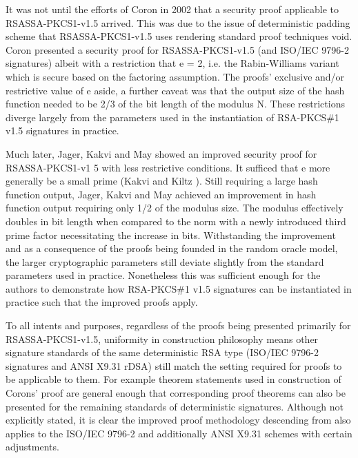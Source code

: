\documentclass[]{final_report}
\theoremstyle{definition}
\begin{document}
It was not until the efforts of Coron \cite{coron2002security} in 2002 that a security proof applicable to RSASSA-PKCS1-v1.5 arrived. This was due to the issue of deterministic padding scheme that RSASSA-PKCS1-v1.5 uses rendering standard proof techniques void. Coron presented a security proof for RSASSA-PKCS1-v1.5 (and ISO/IEC 9796-2 signatures) albeit with a restriction that e = 2, i.e. the Rabin-Williams variant \cite{coron2002security} which is secure based on the factoring assumption. 
The proofs' exclusive and/or restrictive value of e aside, a further caveat was that the output size of the hash function needed to be 2/3 of the bit length of the modulus N. These restrictions diverge largely from the parameters used in the instantiation of RSA-PKCS\#1 v1.5 signatures in practice. 

Much later, Jager, Kakvi and May \cite{jager2018security} showed an improved security proof for RSASSA-PKCS1-v1 5 with less restrictive conditions.
It sufficed that e more generally be a small prime (Kakvi and Kiltz \cite{kakvi2018optimal}). Still requiring a large hash function output, Jager, Kakvi and May achieved an improvement in hash function output requiring only 1/2 of the modulus size. The modulus effectively doubles in bit length when compared to the norm with a newly introduced third prime factor necessitating the increase in bits.
Withstanding the improvement and as a consequence of the proofs being founded in the random oracle model, the larger cryptographic parameters still deviate slightly from the standard parameters used in practice. Nonetheless this was sufficient enough for the authors to demonstrate how RSA-PKCS\#1 v1.5 signatures can be instantiated in practice such that the improved proofs apply. 

To all intents and purposes, regardless of the proofs being presented primarily for RSASSA-PKCS1-v1.5, uniformity in construction philosophy means other signature standards of the same deterministic RSA type (ISO/IEC 9796-2 signatures and ANSI X9.31 rDSA) still match the setting required for proofs to be applicable to them. For example theorem statements used in construction of Corons' proof \cite{coron2002security} are general enough that corresponding proof theorems can also be presented for the remaining standards of deterministic signatures. Although not explicitly stated, it is clear the improved proof methodology descending from \cite{coron2002security} also applies to the ISO/IEC 9796-2 and additionally ANSI X9.31 schemes with certain adjustments.
\end{document}
